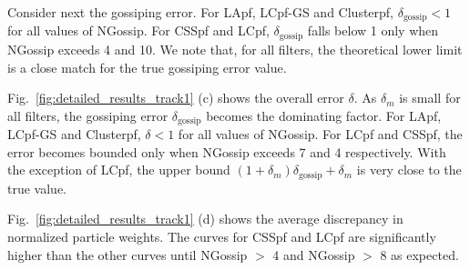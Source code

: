 \documentclass[10pt,letterpaper,final]{article}
\begin{document}
Consider next the gossiping error. For LApf, LCpf-GS and Clusterpf, $\delta_{\text{gossip}}<1$ for all values of NGossip. For CSSpf and LCpf, $\delta_{\text{gossip}}$ falls below 1 only when NGossip exceeds 4 and 10. We note that, for all filters, the theoretical lower limit is a close match for the true gossiping error value. 

Fig.~\ref{fig:detailed_results_track1} (c) shows the overall error $\delta$. As $\delta_m$ is small for all filters, the gossiping error $\delta_{\text{gossip}}$ becomes the dominating factor. For LApf, LCpf-GS and Clusterpf, $\delta<1$ for all values of NGossip. For LCpf and CSSpf, the error becomes bounded only when NGossip exceeds 7 and 4 respectively. With the exception of LCpf, the upper bound $(1+\delta_m)\delta_{\text{gossip}}+\delta_m$ is very close to the true value. 

Fig.~\ref{fig:detailed_results_track1} (d) shows the average discrepancy in normalized particle weights. The curves for CSSpf and LCpf are significantly higher than the other curves until NGossip $>$ 4 and NGossip $>$ 8 as expected. 
\end{document}
